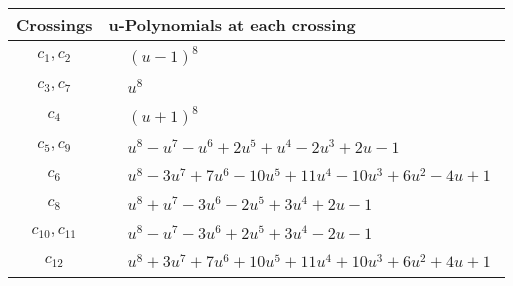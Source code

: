 \documentclass[1p]{elsarticle_modified}
\theoremstyle{definition}
\begin{document}
\begin{tabular}{m{50pt}|m{274pt}}
Crossings & \hspace{64pt}u-Polynomials at each crossing \\
\hline $$\begin{aligned}c_{1},c_{2}\end{aligned}$$&$\begin{aligned}
&(u-1)^8
\end{aligned}$\\
\hline $$\begin{aligned}c_{3},c_{7}\end{aligned}$$&$\begin{aligned}
&u^8
\end{aligned}$\\
\hline $$\begin{aligned}c_{4}\end{aligned}$$&$\begin{aligned}
&(u+1)^8
\end{aligned}$\\
\hline $$\begin{aligned}c_{5},c_{9}\end{aligned}$$&$\begin{aligned}
&u^8- u^7- u^6+2 u^5+u^4-2 u^3+2 u-1
\end{aligned}$\\
\hline $$\begin{aligned}c_{6}\end{aligned}$$&$\begin{aligned}
&u^8-3 u^7+7 u^6-10 u^5+11 u^4-10 u^3+6 u^2-4 u+1
\end{aligned}$\\
\hline $$\begin{aligned}c_{8}\end{aligned}$$&$\begin{aligned}
&u^8+u^7-3 u^6-2 u^5+3 u^4+2 u-1
\end{aligned}$\\
\hline $$\begin{aligned}c_{10},c_{11}\end{aligned}$$&$\begin{aligned}
&u^8- u^7-3 u^6+2 u^5+3 u^4-2 u-1
\end{aligned}$\\
\hline $$\begin{aligned}c_{12}\end{aligned}$$&$\begin{aligned}
&u^8+3 u^7+7 u^6+10 u^5+11 u^4+10 u^3+6 u^2+4 u+1
\end{aligned}$\\
\hline
\end{tabular}\\~\\
\end{document}
